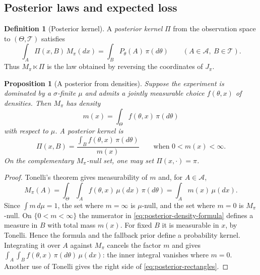 \documentclass[11pt,oneside]{book}
\newtheorem{proposition}[theorem]{Proposition}
\theoremstyle{definition}
\newtheorem{definition}[theorem]{Definition}
\theoremstyle{remark}
\begin{document}
\subsection{Posterior laws and expected loss}
\label{subsec:posterior-loss}

\begin{definition}[Posterior kernel]
\label{def:posterior-kernel}
A \emph{posterior kernel} $\Pi$ from the observation space to
$(\Theta,\mathcal T)$ satisfies
\begin{equation}
\int_A\Pi(x,B)\,M_\pi(dx)
=\int_B P_\theta(A)\,\pi(d\theta)
\qquad(A\in\mathcal A,\ B\in\mathcal T).
\label{eq:posterior-rectangles}
\end{equation}
Thus $M_\pi\ltimes\Pi$ is the law obtained by reversing the coordinates
of $J_\pi$.
\end{definition}

\begin{proposition}[A posterior from densities]
\label{prop:posterior-from-densities}
Suppose the experiment is dominated by a $\sigma$-finite $\mu$ and
admits a jointly measurable choice $f(\theta,x)$ of densities. Then
$M_\pi$ has density
\[
m(x)=\int_\Theta f(\theta,x)\,\pi(d\theta)
\]
with respect to $\mu$. A posterior kernel is
\begin{equation}
\Pi(x,B)=\frac{\int_B f(\theta,x)\,\pi(d\theta)}{m(x)}
\qquad\text{when }0<m(x)<\infty.
\label{eq:posterior-density-formula}
\end{equation}
On the complementary $M_\pi$-null set, one may set $\Pi(x,\cdot)=\pi$.
\end{proposition}
\begin{proof}
Tonelli's theorem gives measurability of $m$ and, for $A\in\mathcal A$,
\[
M_\pi(A)=\int_\Theta\int_A f(\theta,x)\,\mu(dx)\,\pi(d\theta)
=\int_A m(x)\,\mu(dx).
\]
Since $\int m\,d\mu=1$, the set where $m=\infty$ is $\mu$-null, and the
set where $m=0$ is $M_\pi$-null. On $\{0<m<\infty\}$ the numerator in
\eqref{eq:posterior-density-formula} defines a measure in $B$ with total
mass $m(x)$. For fixed $B$ it is measurable in $x$, by Tonelli. Hence the
formula and the fallback prior define a probability kernel. Integrating
it over $A$ against $M_\pi$ cancels the factor $m$ and gives
$\int_A\int_B f(\theta,x)\,\pi(d\theta)\,\mu(dx)$: the inner integral
vanishes where $m=0$. Another use of Tonelli gives the right side of
\eqref{eq:posterior-rectangles}.
\end{proof}
\end{document}
